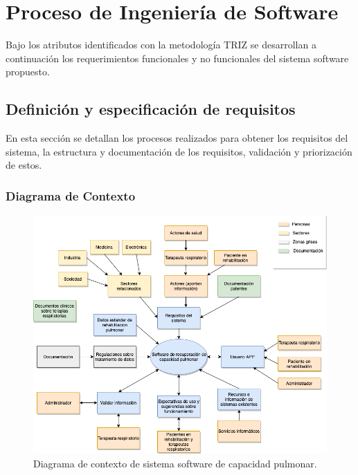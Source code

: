 \documentclass[12pt]{article}
\begin{document}
\section{Proceso de Ingeniería de Software}



Bajo los atributos identificados con la metodología TRIZ se desarrollan a continuación los requerimientos funcionales y no funcionales del sistema software propuesto.


\subsection{Definición y especificación de requisitos}

En esta sección se detallan los procesos realizados para obtener los requisitos del sistema, la estructura y documentación de los requisitos, validación y priorización de estos.

\subsubsection{Diagrama de Contexto}


\begin{figure}[ht]
\centering
\includegraphics[scale=0.45]{imag/C4-Dcontext.png}
\caption{Diagrama de contexto de sistema software de capacidad pulmonar. }
\label{4}
\end{figure}
\FloatBarrier
\end{document}
